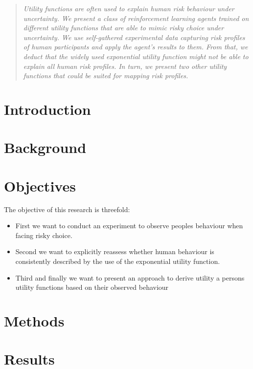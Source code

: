 \documentclass{article}
\begin{document}
\printAffiliationsAndNotice{\icmlEqualContribution} %

\begin{abstract}
\textit{Utility functions are often used to explain human risk behaviour under uncertainty. We present a class of reinforcement learning agents trained on different utility functions that are able to mimic risky choice under uncertainty. We use self-gathered experimental data capturing risk profiles of human participants and apply the agent's results to them. From that, we deduct that the widely used exponential utility function might not be able to explain all human risk profiles. In turn, we present two other utility functions that could be suited for mapping risk profiles.}
\end{abstract}

\section{Introduction}\label{sec:introduction}

\section{Background}\label{sec:background}

\section{Objectives}\label{sec:objectives}
The objective of this research is threefold:
\begin{itemize}
    \item First we want to conduct an experiment to observe peoples behaviour when facing risky choice. 
    \item Second we want to explicitly reassess whether human behaviour is consistently described by the use of the exponential utility function.
    \item Third and finally we want to present an approach to derive utility a persons utility functions based on their observed behaviour
\end{itemize}


\section{Methods}\label{sec:methods}


\section{Results}\label{sec:results}

\end{document}
